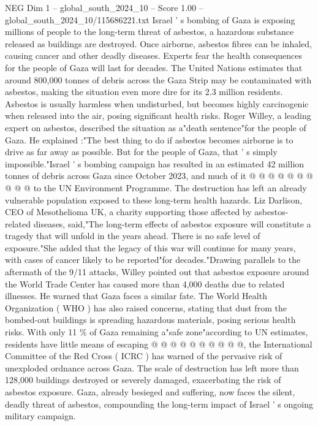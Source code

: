 \begin{textsample}{NEG Dim 1 – global\_south\_2024\_10 – Score 1.00 – global\_south\_2024\_10/115686221.txt}  \label{ex:f1_neg_436}
Israel ' s bombing of Gaza is exposing millions of people to the long-term threat of asbestos, a hazardous substance released as buildings are destroyed.
Once airborne, asbestos fibres can be inhaled, causing cancer and other deadly diseases.
Experts fear the health consequences for the people of Gaza will last for decades.
The United Nations estimates that around 800,000 tonnes of debris across the Gaza Strip may be contaminated with asbestos, making the situation even more dire for its 2.3 million residents.
Asbestos is usually harmless when undisturbed, but becomes highly carcinogenic when released into the air, posing significant health risks.
Roger Willey, a leading expert on asbestos, described the situation as a"death sentence"for the people of Gaza.
He explained :"The best thing to do if asbestos becomes airborne is to drive as far away as possible.
But for the people of Gaza, that ' s simply impossible."Israel ' s bombing campaign has resulted in an estimated 42 million tonnes of debris across Gaza since October 2023, and much of it @ @ @ @ @ @ @ @ @ @ to the UN Environment Programme.
The destruction has left an already vulnerable population exposed to these long-term health hazards.
Liz Darlison, CEO of Mesothelioma UK, a charity supporting those affected by asbestos-related diseases, said,"The long-term effects of asbestos exposure will constitute a tragedy that will unfold in the years ahead.
There is no safe level of exposure."She added that the legacy of this war will continue for many years, with cases of cancer likely to be reported"for decades."Drawing parallels to the aftermath of the 9/11 attacks, Willey pointed out that asbestos exposure around the World Trade Center has caused more than 4,000 deaths due to related illnesses.
He warned that Gaza faces a similar fate.
The World Health Organization ( WHO ) has also raised concerns, stating that dust from the bombed-out buildings is spreading hazardous materials, posing serious health risks.
With only 11 \% of Gaza remaining a"safe zone"according to UN estimates, residents have little means of escaping @ @ @ @ @ @ @ @ @ @, the International Committee of the Red Cross ( ICRC ) has warned of the pervasive risk of unexploded ordnance across Gaza.
The scale of destruction has left more than 128,000 buildings destroyed or severely damaged, exacerbating the risk of asbestos exposure.
Gaza, already besieged and suffering, now faces the silent, deadly threat of asbestos, compounding the long-term impact of Israel ' s ongoing military campaign.

\end{textsample}
